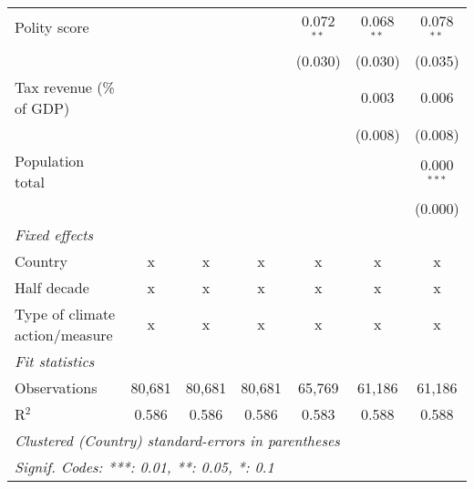 \begin{tabular}{lcccccc}
   Polity score                                                             &         &               &               & 0.072$^{**}$  & 0.068$^{**}$  & 0.078$^{**}$\\   
                                                                            &         &               &               & (0.030)       & (0.030)       & (0.035)\\   
   Tax revenue (\% of GDP)                                                  &         &               &               &               & 0.003         & 0.006\\   
                                                                            &         &               &               &               & (0.008)       & (0.008)\\   
   Population total                                                         &         &               &               &               &               & 0.000$^{***}$\\   
                                                                            &         &               &               &               &               & (0.000)\\   
   \emph{Fixed effects}\\
   Country                                                                  & x       & x             & x             & x             & x             & x\\  
   Half decade                                                              & x       & x             & x             & x             & x             & x\\  
   Type of climate action/measure                                           & x       & x             & x             & x             & x             & x\\  
   \midrule \emph{Fit statistics}\\
   Observations                                                             & 80,681  & 80,681        & 80,681        & 65,769        & 61,186        & 61,186\\  
   R$^2$                                                                    & 0.586   & 0.586         & 0.586         & 0.583         & 0.588         & 0.588\\  
   \midrule
   \multicolumn{7}{l}{\emph{Clustered (Country) standard-errors in parentheses}}\\
   \multicolumn{7}{l}{\emph{Signif. Codes: ***: 0.01, **: 0.05, *: 0.1}}\\
\end{tabular}
\par\endgroup


